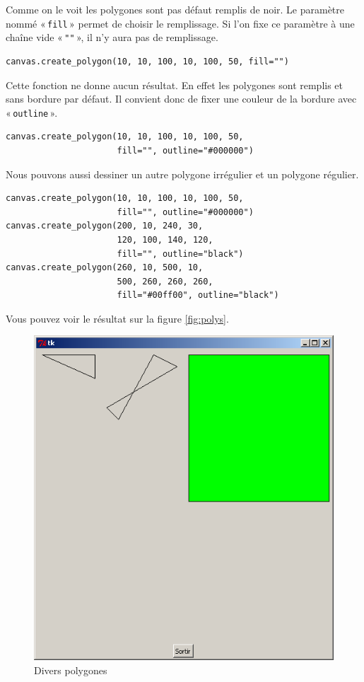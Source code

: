 Comme on le voit les polygones sont pas défaut remplis de noir. Le paramètre nommé « \texttt{fill} » permet de choisir le remplissage. Si l'on fixe ce paramètre à une chaîne vide « \texttt{""} », il n'y aura pas de remplissage.

\begin{Verbatim}[frame=single,rulecolor=\color{mbleu}, label=à taper]
canvas.create_polygon(10, 10, 100, 10, 100, 50, fill="")
\end{Verbatim}

Cette fonction ne donne aucun résultat. En effet les polygones sont remplis et sans bordure par défaut. Il convient donc de fixer une couleur de la bordure avec « \texttt{outline} ».

\begin{Verbatim}[frame=single,rulecolor=\color{mbleu}, label=à taper]
canvas.create_polygon(10, 10, 100, 10, 100, 50, 
                      fill="", outline="#000000")
\end{Verbatim}

Nous pouvons aussi dessiner un autre polygone irrégulier et un polygone régulier.

\begin{Verbatim}[frame=single,rulecolor=\color{mbleu}, label=à taper]
canvas.create_polygon(10, 10, 100, 10, 100, 50,
                      fill="", outline="#000000")
canvas.create_polygon(200, 10, 240, 30,
                      120, 100, 140, 120,
                      fill="", outline="black")
canvas.create_polygon(260, 10, 500, 10,
                      500, 260, 260, 260,
                      fill="#00ff00", outline="black")
\end{Verbatim}

Vous pouvez voir le résultat sur la figure \autoref{fig:polys}.
\begin{figure}[h!]
\centering
\includegraphics[scale=0.4]{images/polys}
\caption{Divers polygones}\label{fig:polys}
\end{figure}

